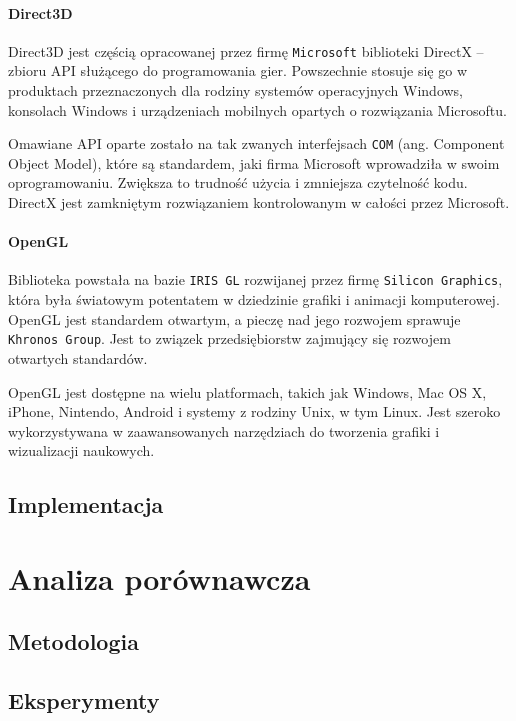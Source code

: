 \documentclass[11pt]{mwrep}
\begin{document}
      \subsubsection{Direct3D}

      Direct3D jest częścią opracowanej przez firmę \texttt{Microsoft} biblioteki DirectX -- zbioru API służącego do programowania gier. Powszechnie stosuje się go w produktach przeznaczonych dla rodziny systemów operacyjnych Windows, konsolach Windows i urządzeniach mobilnych opartych o rozwiązania Microsoftu.
 
      Omawiane API oparte zostało na tak zwanych interfejsach \texttt{COM} (ang. Component Object Model), które są standardem, jaki firma Microsoft wprowadziła w swoim oprogramowaniu. Zwiększa to trudność użycia i zmniejsza czytelność kodu. DirectX jest zamkniętym rozwiązaniem kontrolowanym w całości przez Microsoft.

      \subsubsection{OpenGL}

      Biblioteka powstała na bazie \texttt{IRIS GL} rozwijanej przez firmę \texttt{Silicon Graphics}, która była światowym potentatem w dziedzinie grafiki i animacji komputerowej. OpenGL jest standardem otwartym, a pieczę nad jego rozwojem sprawuje \texttt{Khronos Group}. Jest to związek przedsiębiorstw zajmujący się rozwojem otwartych standardów.

      OpenGL jest dostępne na wielu platformach, takich jak Windows, Mac OS X, iPhone, Nintendo, Android i systemy z rodziny Unix, w tym Linux. Jest szeroko wykorzystywana w zaawansowanych narzędziach do tworzenia grafiki i wizualizacji naukowych.

  \section{Implementacja}

\chapter{Analiza porównawcza}
  \section{Metodologia}
  \section{Eksperymenty}
\end{document}
